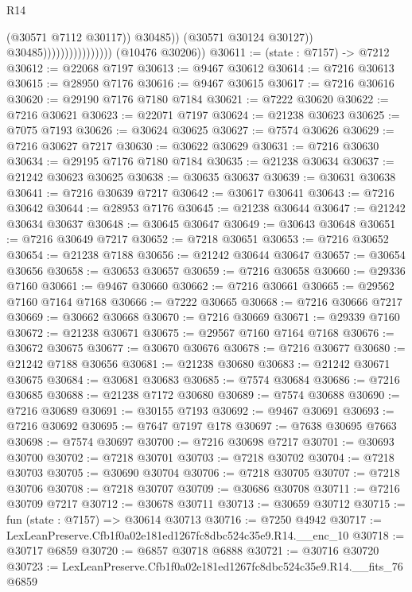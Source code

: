 \begin{lexlean}{R14}
\begin{coremodule}
                                              (@30571 @7112 @30117))
                                            @30485))
                                        (@30571 @30124 @30127))
                                      @30485))))))))))))))))
      (@10476 @30206))
@30611 := (state : @7157) -> @7212
@30612 := @22068 @7197
@30613 := @9467 @30612
@30614 := @7216 @30613
@30615 := @28950 @7176
@30616 := @9467 @30615
@30617 := @7216 @30616
@30620 := @29190 @7176 @7180 @7184
@30621 := @7222 @30620
@30622 := @7216 @30621
@30623 := @22071 @7197
@30624 := @21238 @30623
@30625 := @7075 @7193
@30626 := @30624 @30625
@30627 := @7574 @30626
@30629 := @7216 @30627 @7217
@30630 := @30622 @30629
@30631 := @7216 @30630
@30634 := @29195 @7176 @7180 @7184
@30635 := @21238 @30634
@30637 := @21242 @30623 @30625
@30638 := @30635 @30637
@30639 := @30631 @30638
@30641 := @7216 @30639 @7217
@30642 := @30617 @30641
@30643 := @7216 @30642
@30644 := @28953 @7176
@30645 := @21238 @30644
@30647 := @21242 @30634 @30637
@30648 := @30645 @30647
@30649 := @30643 @30648
@30651 := @7216 @30649 @7217
@30652 := @7218 @30651
@30653 := @7216 @30652
@30654 := @21238 @7188
@30656 := @21242 @30644 @30647
@30657 := @30654 @30656
@30658 := @30653 @30657
@30659 := @7216 @30658
@30660 := @29336 @7160
@30661 := @9467 @30660
@30662 := @7216 @30661
@30665 := @29562 @7160 @7164 @7168
@30666 := @7222 @30665
@30668 := @7216 @30666 @7217
@30669 := @30662 @30668
@30670 := @7216 @30669
@30671 := @29339 @7160
@30672 := @21238 @30671
@30675 := @29567 @7160 @7164 @7168
@30676 := @30672 @30675
@30677 := @30670 @30676
@30678 := @7216 @30677
@30680 := @21242 @7188 @30656
@30681 := @21238 @30680
@30683 := @21242 @30671 @30675
@30684 := @30681 @30683
@30685 := @7574 @30684
@30686 := @7216 @30685
@30688 := @21238 @7172 @30680
@30689 := @7574 @30688
@30690 := @7216 @30689
@30691 := @30155 @7193
@30692 := @9467 @30691
@30693 := @7216 @30692
@30695 := @7647 @7197 @178
@30697 := @7638 @30695 @7663
@30698 := @7574 @30697
@30700 := @7216 @30698 @7217
@30701 := @30693 @30700
@30702 := @7218 @30701
@30703 := @7218 @30702
@30704 := @7218 @30703
@30705 := @30690 @30704
@30706 := @7218 @30705
@30707 := @7218 @30706
@30708 := @7218 @30707
@30709 := @30686 @30708
@30711 := @7216 @30709 @7217
@30712 := @30678 @30711
@30713 := @30659 @30712
@30715 := fun (state : @7157) => @30614 @30713
@30716 := @7250 @4942
@30717 := LexLeanPreserve.Cfb1f0a02e181ed1267fc8dbc524c35e9.R14.__enc_10
@30718 := @30717 @6859
@30720 := @6857 @30718 @6888
@30721 := @30716 @30720
@30723 := LexLeanPreserve.Cfb1f0a02e181ed1267fc8dbc524c35e9.R14.__fits_76 @6859

\end{coremodule}
\end{lexlean}
